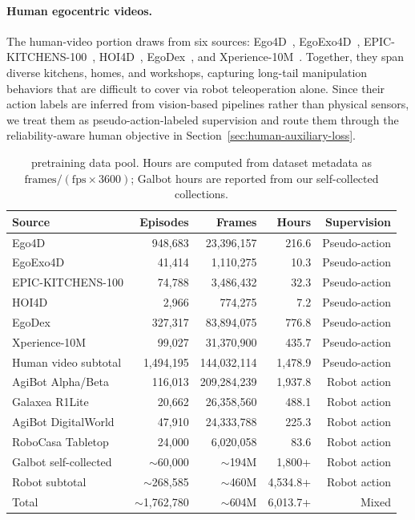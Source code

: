 \paragraph{Human egocentric videos.}
The human-video portion draws from six sources: Ego4D~\cite{grauman2022ego4d}, EgoExo4D~\cite{grauman2024egoexo4d}, EPIC-KITCHENS-100~\cite{damen2018epic}, HOI4D~\cite{liu2022hoi4d}, EgoDex~\cite{hoque2025egodex}, and Xperience-10M~\cite{xperience_10m}. Together, they span diverse kitchens, homes, and workshops, capturing long-tail manipulation behaviors that are difficult to cover via robot teleoperation alone. Since their action labels are inferred from vision-based pipelines rather than physical sensors, we treat them as pseudo-action-labeled supervision and route them through the reliability-aware human objective in Section~\ref{sec:human-auxiliary-loss}.



\begin{table}[h]
\centering
\small
\caption{\Ours pretraining data pool. Hours are computed from dataset metadata as $\text{frames} / (\text{fps} \times 3600)$; Galbot hours are reported from our self-collected collections.}
\label{tab:pretraining-data-main}
\begin{tabular}{lrrrr}
\toprule
Source & Episodes & Frames & Hours & Supervision \\
\midrule
Ego4D & 948,683 & 23,396,157 & 216.6 & Pseudo-action \\
EgoExo4D & 41,414 & 1,110,275 & 10.3 & Pseudo-action \\
EPIC-KITCHENS-100 & 74,788 & 3,486,432 & 32.3 & Pseudo-action \\
HOI4D & 2,966 & 774,275 & 7.2 & Pseudo-action \\
EgoDex & 327,317 & 83,894,075 & 776.8 & Pseudo-action \\
Xperience-10M & 99,027 & 31,370,900 & 435.7 & Pseudo-action \\
\midrule
Human video subtotal & 1,494,195 & 144,032,114 & 1,478.9 & Pseudo-action \\
\midrule
AgiBot Alpha/Beta & 116,013 & 209,284,239 & 1,937.8 & Robot action \\
Galaxea R1Lite & 20,662 & 26,358,560 & 488.1 & Robot action \\
AgiBot DigitalWorld & 47,910 & 24,333,788 & 225.3 & Robot action \\
RoboCasa Tabletop & 24,000 & 6,020,058 & 83.6 & Robot action \\
Galbot self-collected & $\sim$60,000 & $\sim$194M & 1,800+ & Robot action \\
\midrule
Robot subtotal & $\sim$268,585 & $\sim$460M & 4,534.8+ & Robot action \\
\midrule
Total & $\sim$1,762,780 & $\sim$604M & 6,013.7+ & Mixed \\
\bottomrule
\end{tabular}
\end{table}



